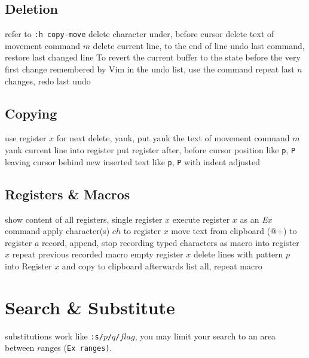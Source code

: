 \subsection{Deletion}	{refer to {\tt :h copy-move}}
	{delete character under, before cursor}
	{delete text of movement command $m$}
	{delete current line, to the end of line}
	{undo last command, restore last changed line}
	{To revert the current buffer to the state before the very
first change remembered by Vim in the undo list, use the command} %
	{repeat last $n$ changes, redo last undo}

\subsection{Copying}	{}
	{use register $x$ for next delete, yank, put}
	{yank the text of movement command $m$}
	{yank current line into register}
	{put register after, before cursor position}
	{like {\tt p}, {\tt P} leaving cursor behind new inserted text}
	{like {\tt p}, {\tt P} with indent adjusted}

\subsection{Registers \& Macros}{}
	{show content of all registers, single register $x$}
	{execute register $x$ as an {\it Ex\/} command}
	{apply character(s) $ch$ to register $x$}
	{move text from clipboard (@+) to register $a$}
	{record, append, stop recording typed characters as macro into register $x$}
	{repeat previous recorded macro}
	{empty register $x$}
	{delete lines with pattern $p$ into Register $x$ and copy to clipboard afterwards}
	{list all, repeat macro}

\section{Search \& Substitute}	{
substitutions work like {\tt:s/$p$/$q$/$flag$}, you may limit your search to
an area between $r$anges ({\tt Ex ranges)}.}

